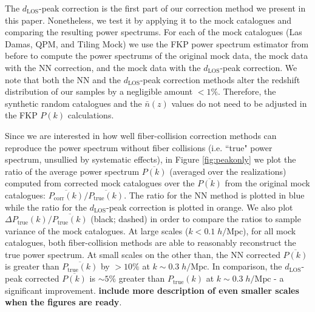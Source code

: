 \documentclass{emulateapj}
\begin{document}
The $d_\mathrm{LOS}$-peak correction is the first part of our correction method we present in this paper. Nonetheless, we test it by applying it to the mock catalogues and comparing the resulting power spectrums. For each of the mock catalogues (Las Damas, QPM, and Tiling Mock) we use the FKP power spectrum estimator from before to compute the power spectrums of the original mock data, the mock data with the NN correction, and the mock data with the $d_\mathrm{LOS}$-peak correction. We note that both the NN and the $d_\mathrm{LOS}$-peak correction methods alter the redshift distribution of our samples by a negligible amount $< 1\%$. Therefore, the synthetic random catalogues and the $\bar{n}(z)$ values do not need to be adjusted in the FKP $P(k)$ calculations.

Since we are interested in how well fiber-collision correction methods can reproduce the power spectrum without fiber collisions (i.e. ``true" power spectrum, unsullied by systematic effects), in Figure \ref{fig:peakonly} we plot the ratio of the average power spectrum $\overline{P(k)}$ (averaged over the realizations) computed from corrected mock catalogues over the $\overline{P(k)}$ from the original mock catalogues: $\overline{P_{\mathrm{corr}}(k)}/\overline{P_\mathrm{true}(k)}$. The ratio for the NN method is plotted in blue while the ratio for the $d_{\mathrm{LOS}}$-peak correction is plotted in orange. We also plot $\Delta P_\mathrm{true}(k) / \overline{P_\mathrm{true}(k)}$ (black; dashed) in order to compare the ratios to sample variance of the mock catalogues. 
At large scales ($k < 0.1 \; h/\mathrm{Mpc}$), for all mock catalogues, both fiber-collision methods are able to reasonably reconstruct the true power spectrum. At small scales on the other than, the NN corrected $\overline{P(k)}$ is greater than $\overline{P_\mathrm{true}(k)}$ by $> 10 \%$ at $ k \sim 0.3\; h/\mathrm{Mpc}$. In comparison, the $d_\mathrm{LOS}$-peak corrected $\overline{P(k)}$ is $\sim 5\%$ greater than $P_\mathrm{true}(k)$ at $k \sim 0.3 \; h/\mathrm{Mpc}$ - a significant improvement. {\bf include more description of even smaller scales when the figures are ready}. 
\end{document}
